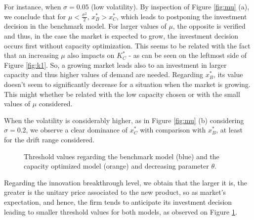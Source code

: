 For instance, when $\sigma=0.05$ (low volatility). By inspection of Figure  \ref{fig:mu} (a), we conclude that for $\mu<\frac{\sigma^2}{2}$, $x^*_B>x^*_C$, which leads to postponing the investment decision in the benchmark model. For larger values of $\mu$, the opposite is verified and thus, in the case the market is expected to grow, the investment decision occurs first without capacity optimization. This seems to be related with the fact that an increasing $\mu$ also impacts on $K_C^*$ - as can be seen on the leftmost side of Figure \ref{fig:k1}. So, a growing market leads also to an investment in larger capacity and thus higher values of demand are needed. Regarding $x^*_B$, its value doesn't seem to significantly decrease for a situation when the market is growing. This might whether be related with the low capacity chosen or with the small values of $\mu$ considered.

When the volatility is considerably higher, as in Figure \ref{fig:mu} (b) considering $\sigma=0.2$, we observe a clear dominance of $x^*_C$ with comparison with $x^*_B$, at least for the drift range considered.







\begin{figure}[!htb]
	\centering
	\caption{Threshold values regarding the benchmark model (blue) and the capacity optimized model (orange) and decreasing parameter $\theta$.}
	\label{fig:td}
\end{figure}

Regarding the innovation breakthrough level, we obtain that the larger it is, the greater is the unitary price associated to the new product, so as market's expectation, and hence, the firm tends to anticipate its investment decision leading to smaller threshold values for both models, as observed on Figure \ref{fig:td}.



